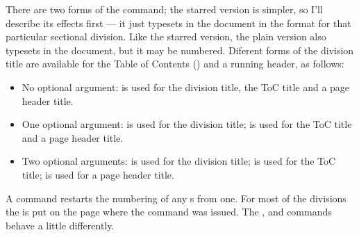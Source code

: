There are two forms of the command;
the starred version is simpler, so I'll describe its
effects first --- it just typesets  in the document in the format
for that particular sectional division. Like the starred version, the plain
version also typesets  in the document, but it may be numbered.
Diferent forms of the division title are available for the
Table of Contents (\toc) and a running header, as follows:
\begin{itemize}
\item No optional argument:  is used for the division title,
      the ToC title and a page header title.
\item One optional argument:  is used for the division title;
       is used for the ToC title and a page header title.
\item Two optional arguments:  is used for the division title;
       is used for the ToC title; 
      is used for a page header title.
\end{itemize}

A \cmd{\section} command restarts the numbering of any \cmd{\subsection}s
from one.
For most of the divisions the  is put on the page where the command
was issued. The \cmd{\book}, \cmd{\part} and \cmd{\chapter} commands behave
a little differently.


